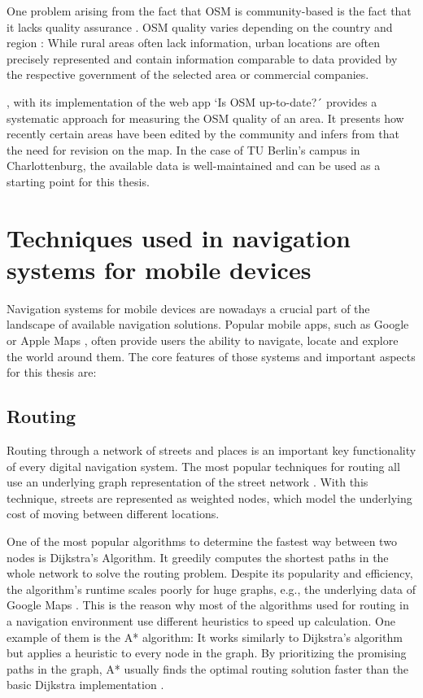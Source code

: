One problem arising from the fact that OSM is community-based is the fact that it lacks quality assurance \cite{quality_of_openstreetmap}. OSM quality varies depending on the country and region \cite{quality_of_openstreetmap}: While rural areas often lack information, urban locations are often precisely represented and contain information comparable to data provided by the respective government of the selected area or commercial companies.

\cite{quality_of_openstreetmap}, with its implementation of the web app `Is OSM up-to-date?´ provides a systematic approach for measuring the OSM quality of an area. It presents how recently certain areas have been edited by the community and infers from that the need for revision on the map. In the case of TU Berlin's campus in Charlottenburg, the available data is well-maintained \cite{is_osm_up_to_date} and can be used as a starting point for this thesis.

\section{Techniques used in navigation systems for mobile devices}
Navigation systems for mobile devices are nowadays a crucial part of the landscape of available navigation solutions. Popular mobile apps, such as Google \cite{google_maps_website} or Apple Maps \cite{apple_maps_website}, often provide users the ability to navigate, locate and explore the world around them. The core features of those systems and important aspects for this thesis are:

\subsection{Routing}
Routing through a network of streets and places is an important key functionality of every digital navigation system. The most popular techniques for routing all use an underlying graph representation of the street network \cite{google_maps}. With this technique, streets are represented as weighted nodes, which model the underlying cost of moving between different locations.

One of the most popular algorithms to determine the fastest way between two nodes is Dijkstra's Algorithm. It greedily computes the shortest paths in the whole network to solve the routing problem. Despite its popularity and efficiency, the algorithm's runtime scales poorly for huge graphs, e.g., the underlying data of Google Maps \cite{google_maps}. This is the reason why most of the algorithms used for routing in a navigation environment use different heuristics to speed up calculation. One example of them is the A* algorithm: It works similarly to Dijkstra's algorithm but applies a heuristic to every node in the graph. By prioritizing the promising paths in the graph, A* usually finds the optimal routing solution faster than the basic Dijkstra implementation \cite{google_maps}.

